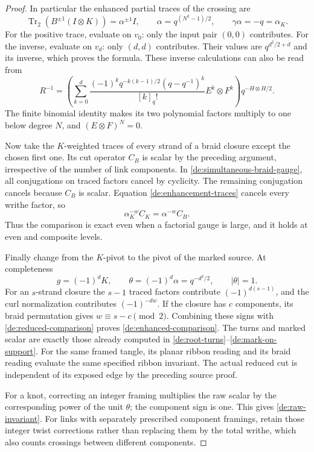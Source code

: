 \begin{proof}
In particular the enhanced partial traces of the crossing are
\begin{equation}\label{de:enhancement-traces}
 \operatorname{Tr}_2(B^{\pm1}(I\otimes K))
       =\alpha^{\pm1}I,\qquad
 \alpha=q^{(N^2-1)/2},\qquad \gamma\alpha=-q=\alpha_K.
\end{equation}
For the positive trace, evaluate on \(v_0\): only the input
pair \((0,0)\) contributes. For the inverse, evaluate on
\(v_d\): only \((d,d)\) contributes. Their values are
\(q^{d^2/2+d}\) and its inverse, which proves the formula.
These inverse calculations can also be read from
\[
 R^{-1}=
 \left(\sum_{k=0}^d
   \frac{(-1)^kq^{-k(k-1)/2}(q-q^{-1})^k}{[k]_q!}
                           E^k\otimes F^k\right)
                             q^{-H\otimes H/2}.
\]
The finite binomial identity makes its two polynomial factors
multiply to one below degree \(N\), and
\((E\otimes F)^N=0\).

Now take the \(K\)-weighted traces of every strand of a braid
closure except the chosen first one. Its cut operator \(C_B\)
is scalar by the preceding argument, irrespective of the number
of link components. In \eqref{de:simultaneous-braid-gauge},
all conjugations on traced factors cancel by cyclicity.
The remaining conjugation cancels because \(C_B\) is scalar.
Equation \eqref{de:enhancement-traces} cancels every writhe
factor, so
\begin{equation}\label{de:reduced-comparison}
                    \alpha_K^{-w}C_K=\alpha^{-w}C_B.
\end{equation}
Thus the comparison is exact even when a factorial gauge is
large, and it holds at even and composite levels.

Finally change from the \(K\)-pivot to the pivot of the marked
source. At completeness
\[
                   g=(-1)^dK,\qquad
 \theta=(-1)^d\alpha=q^{-d^2/2},\qquad |\theta|=1.
\]
For an \(s\)-strand closure the \(s-1\) traced factors contribute
\((-1)^{d(s-1)}\), and the curl normalization contributes
\((-1)^{-dw}\). If the closure has \(c\) components, its braid
permutation gives \(w\equiv s-c\pmod2\). Combining these signs
with \eqref{de:reduced-comparison} proves
\eqref{de:enhanced-comparison}. The turns and marked scalar
are exactly those already computed in
\eqref{de:root-turns}--\eqref{de:mark-on-support}.
For the same framed tangle, its planar ribbon reading and its
braid reading evaluate the same specified ribbon invariant.
The actual reduced cut is independent of its exposed edge by
the preceding source proof.

For a knot, correcting an integer framing multiplies the raw
scalar by the corresponding power of the unit \(\theta\);
the component sign is one. This gives
\eqref{de:raw-invariant}. For links with separately prescribed
component framings, retain those integer twist corrections
rather than replacing them by the total writhe, which also
counts crossings between different components.
\end{proof}

